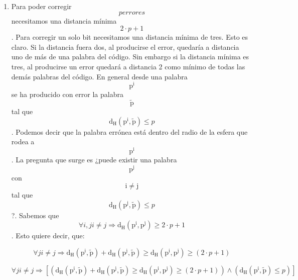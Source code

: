 \begin{enumerate}
\begin{enumerate}
\begin{enumerate}
\begin{enumerate}
        palabra con el bit equivocado quede de forma tal que sea claro
        desde cual palabra del código correcto se ha producido el error.
        No podremos tener dos palabras distintas del código a distancia
        mínima de la pa\-labra equivocada, sino solamente una. La
        corrección consistiría en cambiar la pa\-labra equivocada por la
        única más cercana del código. El principio de corrección es el
        máxima verosimilitud (esperanza matemática).
      \item
        Para poder corregir\[p\mathit{errores}\]necesitamos una
        distancia mínima\[{2 \cdot p} + 1\]. Para corregir un solo bit
        necesitamos una distancia mínima de tres. Esto es claro. Si la
        distancia fuera dos, al producirse el error, quedaría a
        distancia uno de más de una palabra del código. Sin embargo si
        la distancia mínima es tres, al producirse un error quedará a
        distancia 2 como mínimo de todas las demás palabras del
        códi\-go. En general desde una palabra
        \[\mathtt{\mathrm{p^{i}}}\] se ha producido con error la palabra
        \[\mathtt{\mathrm{\widetilde{p}}}\]tal que
        \[\mathtt{\mathrm{d_{H}}}{\left( {\mathtt{\mathrm{p^{i}}},\mathtt{\mathrm{\widetilde{p}}}} \right) \leq p}\].
        Podemos decir que la palabra errónea está dentro del radio de la
        esfera que rodea a \[\mathtt{\mathrm{p^{i}}}\]. La pregunta que
        surge es ¿puede existir una palabra
        \[\mathtt{\mathrm{p^{j}}}\]con \[\mathtt{\mathrm{i \neq j}}\]tal
        que
        \[\mathtt{\mathrm{d_{H}}}{\left( {\mathtt{\mathrm{p^{j}}},\mathtt{\mathrm{\widetilde{p}}}} \right) \leq p}\]?.
        Sabemos que
        \[\forall i,j{i \neq j}\Rightarrow\mathtt{\mathrm{d_{H}}}{\left( {\mathtt{\mathrm{p^{i}}},\mathtt{\mathrm{p^{j}}}} \right) \geq {{2 \cdot p} + 1}}\].
        Esto quiere decir, que:

        \[\forall j{i \neq j}\Rightarrow\mathtt{\mathrm{d_{H}}}{\left( {\mathtt{\mathrm{p^{i}}},\mathtt{\mathrm{\widetilde{p}}}} \right) + \mathtt{\mathrm{d_{H}}}}{\left( {\mathtt{\mathrm{p^{j}}},\mathtt{\mathrm{\widetilde{p}}}} \right) \geq \mathtt{\mathrm{d_{H}}}}{\left( {\mathtt{\mathrm{p^{i}}},\mathtt{\mathrm{p^{j}}}} \right) \geq \left( {{2 \cdot p} + 1} \right)}\]

        \[\forall j{i \neq j}\Rightarrow\left\lbrack {\left( {\mathtt{\mathrm{d_{H}}}{\left( {\mathtt{\mathrm{p^{i}}},\mathtt{\mathrm{\widetilde{p}}}} \right) + \mathtt{\mathrm{d_{H}}}}{\left( {\mathtt{\mathrm{p^{j}}},\mathtt{\mathrm{\widetilde{p}}}} \right) \geq \mathtt{\mathrm{d_{H}}}}{\left( {\mathtt{\mathrm{p^{i}}},\mathtt{\mathrm{p^{j}}}} \right) \geq \left( {{2 \cdot p} + 1} \right)}} \right) \land \left( {\mathtt{\mathrm{d_{H}}}{\left( {\mathtt{\mathrm{p^{i}}},\mathtt{\mathrm{\widetilde{p}}}} \right) \leq p}} \right)} \right\rbrack\]


\end{enumerate}
\end{enumerate}
\end{enumerate}
\end{enumerate}
